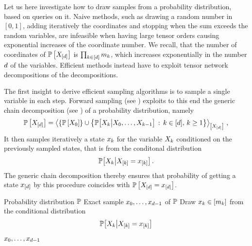 
Let us here investigate how to draw samples from a probability distribution, based on queries on it.
Naive methods, such as drawing a random number in $[0,1]$, adding iteratively the coordinates and stopping when the sum exceeds the random variables, are infeasible when having large tensor orders causing exponential increases of the coordinate number.
We recall, that the number of coordinates of $\mathbb{P}\left[X_{[d]}\right]$ is $\prod_{k\in[d]}m_{k}$, which increases exponentially in the number $d$ of the variables.
Efficient methods instead have to exploit tensor network decompositions of the decompositions.


The first insight to derive efficient sampling algorithms is to sample a single variable in each step.
Forward sampling (see ) exploits to this end the generic chain decomposition (see ) of a probability distribution, namely
\begin{align*}
    \mathbb{P}\left[X_{[d]}\right] = \left\langle \{\mathbb{P}\left[X_{0}\right]\} \cup
    \left\{\mathbb{P}\big[X_{k}\big|X_{0},\ldots,X_{k-1}\big] \,:\, k\in[d] ,\, k\geq 1\right\}
    \right\rangle_{\left[ X_{[d]} \right]} \, ,
\end{align*}
It then samples iteratively a state $x_{k}$ for the variable $X_{k}$ conditioned on the previously sampled states, that is from the conditonal distribution
\begin{align*}
    \mathbb{P}\big[X_{k}\big|X_{[k]}=x_{[k]}\big] \, .
\end{align*}
The generic chain decomposition thereby ensures that probability of getting a state $x_{[d]}$ by this procedure coincides with $\mathbb{P}\left[X_{[d]}=x_{[d]}\right]$.

\begin{algorithm}[hbt!]
    \caption{Forward Sampling}\label{alg:ForwardSampling}
    \begin{algorithmic}
        \Require Probability distribution $\mathbb{P}$
        \Ensure Exact sample $x_{0},\ldots,x_{d-1}$ of $\mathbb{P}$
    \iosepline
        \ForAll{$\catenumeratorin$}
            \State Draw $x_{k}\in[m_{k}]$ from the conditional distribution
            \begin{align*}
                \mathbb{P}\big[X_{k}\big|X_{[k]}=x_{[k]}\big]
            \end{align*}
        \EndFor
        \State \Return $x_{0},\ldots,x_{d-1}$
    \end{algorithmic}
\end{algorithm}

